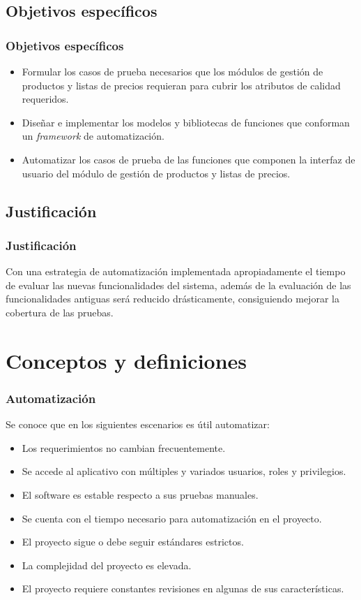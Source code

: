 \documentclass{beamer}
\begin{document}
\subsection{Objetivos específicos}

\begin{frame}
\frametitle{Objetivos específicos}
\begin{itemize}
\item Formular los casos de prueba necesarios que los módulos de gestión de
    productos y listas de precios requieran para cubrir los atributos de calidad
    requeridos.
\item Diseñar e implementar los modelos y bibliotecas de funciones que
    conforman un \emph{framework} de automatización.
\item Automatizar los casos de prueba de las funciones que componen la interfaz
    de usuario del módulo de gestión de productos y listas de precios.
\end{itemize}
\end{frame}

\subsection{Justificación}

\begin{frame}
\frametitle{Justificación}
Con una estrategia de automatización implementada apropiadamente el tiempo de
evaluar las nuevas funcionalidades del sistema, además de la evaluación de las
funcionalidades antiguas será reducido drásticamente, consiguiendo mejorar la
cobertura de las pruebas.
\end{frame}

\section{Conceptos y definiciones}

\begin{frame}
\frametitle{Automatización}
Se conoce que en los siguientes escenarios es útil automatizar:
\begin{itemize}
    \item Los requerimientos no cambian frecuentemente.
    \item Se accede al aplicativo con múltiples y variados usuarios, roles y
        privilegios.
    \item El software es estable respecto a sus pruebas manuales.
    \item Se cuenta con el tiempo necesario para automatización en el proyecto.
    \item El proyecto sigue o debe seguir estándares estrictos.
    \item La complejidad del proyecto es elevada.
    \item El proyecto requiere constantes revisiones en algunas de sus
    características.
\end{itemize}
\end{frame}
\end{document}
